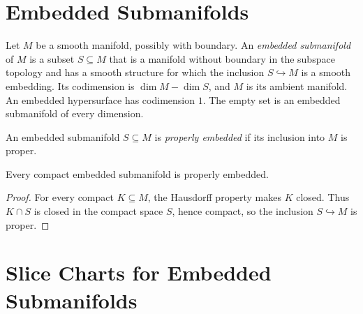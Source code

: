 

\section{Embedded Submanifolds}

\begin{definition}
\label{def:5-28-extra-1}




Let $M$ be a smooth manifold, possibly with boundary. An \emph{embedded
submanifold} of $M$ is a subset $S\subseteq M$ that is a manifold without
boundary in the subspace topology and has a smooth structure for which the
inclusion $S\hookrightarrow M$ is a smooth embedding. Its codimension is
$\dim M-\dim S$, and $M$ is its ambient manifold. An embedded hypersurface has
codimension $1$. The empty set is an embedded submanifold of every dimension.
\end{definition}

\begin{definition}
\label{def:5-28-extra-2}




An embedded submanifold $S\subseteq M$ is \emph{properly embedded} if its
inclusion into $M$ is proper.
\end{definition}

\begin{corollary}
\label{cor:5-6}




Every compact embedded submanifold is properly embedded.
\end{corollary}

\begin{proof}

For every compact $K\subseteq M$, the Hausdorff property makes $K$ closed.
Thus $K\cap S$ is closed in the compact space $S$, hence compact, so the
inclusion $S\hookrightarrow M$ is proper.
\end{proof}


\section{Slice Charts for Embedded Submanifolds}

